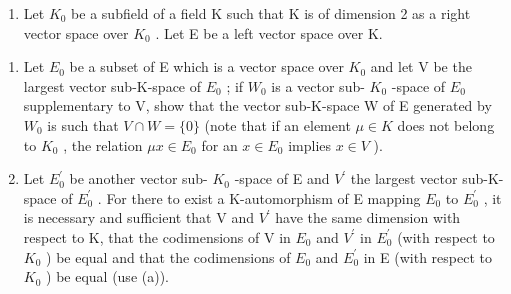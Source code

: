 \begin{enumerate}
\def\labelenumi{\arabic{enumi}.}
\setcounter{enumi}{4}
\tightlist
\item
  Let \(K_{0}\) be a subfield of a field K such that K is of dimension 2 as a right vector space over \(K_{0}\) . Let E be a left vector space over K.
\end{enumerate}

\begin{enumerate}
\def\labelenumi{(\alph{enumi})}
\item
  Let \(E_{0}\) be a subset of E which is a vector space over \(K_{0}\) and let V be the largest vector sub-K-space of \(E_{0}\) ; if \(W_{0}\) is a vector sub- \(K_{0}\) -space of \(E_{0}\) supplementary to V, show that the vector sub-K-space W of E generated by \(W_{0}\) is such that \(V \cap W = \{0\}\) (note that if an element \(\mu \in K\) does not belong to \(K_{0}\) , the relation \(\mu x \in E_{0}\) for an \(x \in E_{0}\) implies \(x \in V\) ).
\item
  Let \(E_{0}^{\prime}\) be another vector sub- \(K_{0}\) -space of E and \(V^{\prime}\) the largest vector sub-K-space of \(E_{0}^{\prime}\) . For there to exist a K-automorphism of E mapping \(E_{0}\) to \(E_{0}^{\prime}\) , it is necessary and sufficient that V and \(V^{\prime}\) have the same dimension with respect to K, that the codimensions of V in \(E_{0}\) and \(V^{\prime}\) in \(E_{0}^{\prime}\) (with respect to \(K_{0}\) ) be equal and that the codimensions of \(E_{0}\) and \(E_{0}^{\prime}\) in E (with respect to \(K_{0}\) ) be equal (use (a)).
\end{enumerate}

